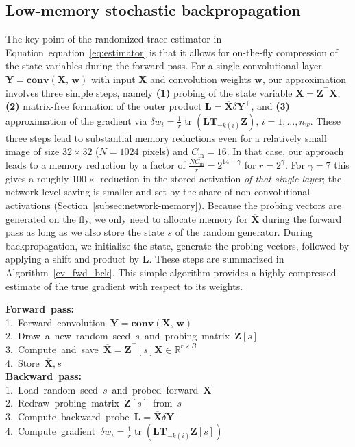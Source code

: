 \documentclass[10pt]{article}
\def\eqref#1{equation~\ref{#1}}
\newcommand{\B}{\mathbf}
\begin{document}
\subsection{Low-memory stochastic backpropagation}\label{subsec:low-mem-algo}
The key point of the randomized trace estimator in Equation~\eqref{eq:estimator} is that it allows for on-the-fly compression of the state variables during the forward pass. For a single convolutional layer $\B{Y}=\B{conv}(\B{X},\,\B{w})$ with input $\B{X}$ and convolution weights $\B{w}$, our approximation involves three simple steps, namely \textbf{(1)} probing of the state variable $\overline{\B{X}} =\B{Z}^\top \B{X}$, \textbf{(2)} matrix-free formation of the outer product $\B{L}=\B{\overline{X}}\delta\B{Y}^\top$, and \textbf{(3)} approximation of the gradient via $\delta w_i=\frac{1}{r}\operatorname{tr}(\B{L}\B{T}_{-k(i)}\B{Z}),\, i=1,\ldots, n_w$. These three steps lead to substantial memory reductions even for a relatively small image of size $32\times 32$ ($N=1024$ pixels) and $C_{\text{in}}=16$. In that case, our approach leads to a memory reduction by a factor of $\frac{N C_{\text{in}}}{r}=2^{14-\gamma}$ for $r=2^\gamma$. For $\gamma=7$ this gives a roughly $100\times$ reduction in the stored activation \emph{of that single layer}; the network-level saving is smaller and set by the share of non-convolutional activations (Section~\ref{subsec:network-memory}). Because the probing vectors are generated on the fly, we only need to allocate memory for $\B{\overline{X}}$ during the forward pass as long as we also store the state $s$ of the random generator. During backpropagation, we initialize the state, generate the probing vectors, followed by applying a shift and product by $\B{L}$. These steps are summarized in Algorithm~\ref{ev_fwd_bck}. This simple algorithm provides a highly compressed estimate of the true gradient with respect to its weights.

\begin{scholmdAlgorithm}
\textbf{Forward~pass:}\\
1.~Forward~convolution~$\B{Y} = \B{conv}(\B{X},\, \B{w})$\\
2.~Draw~a~new~random~seed~$s$~and~probing~matrix~$\B{Z}[s]$\\
3.~Compute~and~save~$\B{\overline{X}} = \B{Z}^\top[s]\B{X} \in \mathbb{R}^{r \times B}$~\\4.~Store~$\overline{\B{X}}, s$\\
\textbf{Backward~pass:}\\
1.~Load~random~seed~$s$~and~probed~forward~$\overline{\B{X}}$\\
2.~Redraw~probing~matrix~$\B{Z}[s]$~from~$s$\\
3.~Compute~backward~probe~$\B{L} = \B{\overline{X}} \delta\B{Y}^\top$\\
4.~Compute~gradient~$\delta w_i = \frac{1}{r} \operatorname{tr}(\B{L} \B{T}_{-k(i)}\B{Z}[s])$
\caption{Low-memory approximate gradient convolutional layer. The random seed $s$ and random probing matrix $\B{Z}$ are independently redrawn for each layer and training iteration.}\label{ev_fwd_bck}
\end{scholmdAlgorithm}
\end{document}
